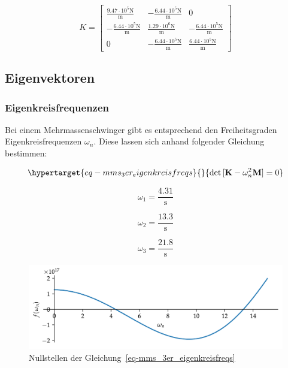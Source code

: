 \documentclass[
  letterpaper,
  DIV=11]{scrreprt}
\begin{document}
\begin{equation}K = \left[\begin{matrix}\frac{9.47 \cdot 10^{5} \text{N}}{\text{m}} & - \frac{6.44 \cdot 10^{5} \text{N}}{\text{m}} & 0\\- \frac{6.44 \cdot 10^{5} \text{N}}{\text{m}} & \frac{1.29 \cdot 10^{6} \text{N}}{\text{m}} & - \frac{6.44 \cdot 10^{5} \text{N}}{\text{m}}\\0 & - \frac{6.44 \cdot 10^{5} \text{N}}{\text{m}} & \frac{6.44 \cdot 10^{5} \text{N}}{\text{m}}\end{matrix}\right]\end{equation}

\hypertarget{eigenvektoren-3}{%
\subsection{Eigenvektoren}\label{eigenvektoren-3}}

\hypertarget{eigenkreisfrequenzen-4}{%
\subsubsection{Eigenkreisfrequenzen}\label{eigenkreisfrequenzen-4}}

Bei einem Mehrmassenschwinger gibt es entsprechend den Freiheitsgraden
Eigenkreisfrequenzen \(\omega_n\). Diese lassen sich anhand folgender
Gleichung bestimmen:

\begin{equation}\protect\hypertarget{eq-mms_3er_eigenkreisfreqs}{}{
\det{[\mathbf{K}-\omega_n^2 \mathbf{M}]=0}
}\label{eq-mms_3er_eigenkreisfreqs}\end{equation}

\begin{equation}\omega_{1} = \frac{4.31}{\text{s}}\end{equation}

\begin{equation}\omega_{2} = \frac{13.3}{\text{s}}\end{equation}

\begin{equation}\omega_{3} = \frac{21.8}{\text{s}}\end{equation}

\begin{figure}[H]

{\centering \includegraphics{index_files/mediabag/mms_04_files/figure-pdf/fig-loesung_eigenkreisfrequenzen-output-1.pdf}

}

\caption{\label{fig-loesung_eigenkreisfrequenzen}Nullstellen der
Gleichung~\ref{eq-mms_3er_eigenkreisfreqs}}

\end{figure}
\end{document}
